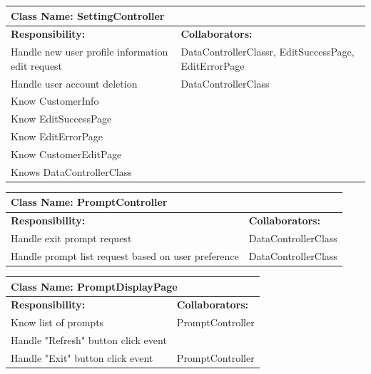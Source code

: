\documentclass[]{article}
\begin{document}
	\begin{table}[H]
	\centering
	\begin{tabular}{|p{6cm}|p{6cm}|}
	\hline 
		\multicolumn{2}{|l|}{\textbf{Class Name: SettingController}} \\
	\hline
	\textbf{Responsibility:} & \textbf{Collaborators:} \\
	\hline
	Handle new user profile information edit request & DataControllerClassr, EditSuccessPage, EditErrorPage\\ \hline
	Handle user account deletion & DataControllerClass\\ \hline
	Know CustomerInfo & \\ \hline 
	Know EditSuccessPage & \\ \hline 
	Know EditErrorPage & \\ \hline
	Know CustomerEditPage & \\ \hline
	Knows DataControllerClass& \\ \hline
	\end{tabular}
	\end{table}
	
	\begin{table}[H]
	\centering
	\begin{tabular}{|p{6cm}|p{6cm}|}
	\hline 
		\multicolumn{2}{|l|}{\textbf{Class Name: PromptController}} \\
	\hline
	\textbf{Responsibility:} & \textbf{Collaborators:} \\
	\hline
	Handle exit prompt request & DataControllerClass\\ \hline
	Handle prompt list request based on user preference & DataControllerClass\\ \hline
	\end{tabular}
	\end{table}

	\begin{table}[H]
	\centering
	\begin{tabular}{|p{6cm}|p{6cm}|}
	\hline 
		\multicolumn{2}{|l|}{\textbf{Class Name: PromptDisplayPage}} \\
	\hline
	\textbf{Responsibility:} & \textbf{Collaborators:} \\
	\hline
	Know list of prompts & PromptController\\ \hline
	Handle "Refresh" button click event  & \\ \hline
	Handle "Exit" button click event  & PromptController \\ \hline
	\end{tabular}
	\end{table}
\end{document}
